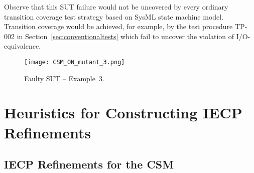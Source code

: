 Observe that this SUT failure would not be uncovered by every ordinary transition coverage test strategy based on SysML state machine model. Transition coverage would be achieved, for example, by the test procedure TP-002 in Section~\ref{sec:conventionaltests}
which fail to uncover the violation of I/O-equivalence.

 

 \begin{figure}
 \hspace*{-10mm}
\texttt{[image: CSM\_ON\_mutant\_3.png]}
\caption{Faulty SUT -- Example~3.}
 \label{fig:mutant3}
 \end{figure}

 

 

\section{Heuristics for Constructing IECP Refinements}\label{sec:refineheuristics}

\subsection{IECP Refinements for the CSM}\label{sec:iecprefine}

